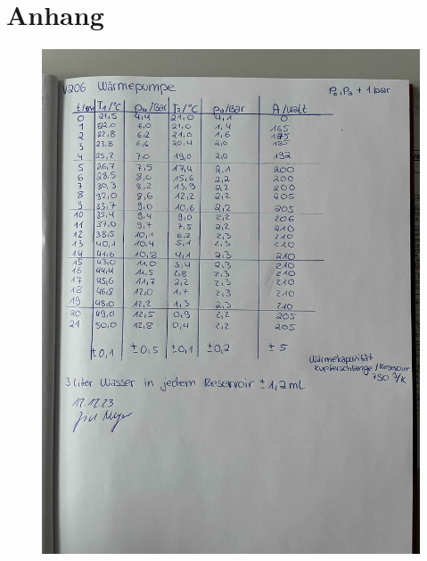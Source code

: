 \section*{Anhang}
\label{sec:Anhang}
\begin{figure}
    \centering
    \includegraphics[width=\textwidth]{messdaten/Messdaten.jpg}
\end{figure}